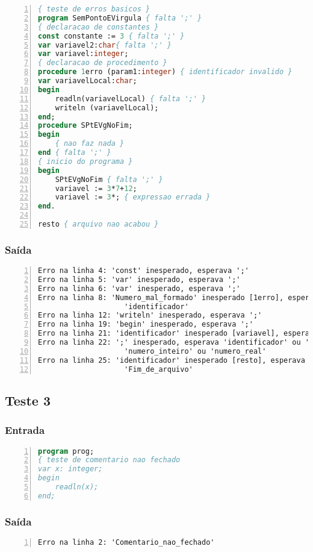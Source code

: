 \documentclass {article}
\begin{document}
	\begin{lstlisting}[language=Pascal,numbers=left,frame=top,frame=bottom]
{ teste de erros basicos }
program SemPontoEVirgula { falta ';' }
{ declaracao de constantes }
const constante := 3 { falta ';' }
var variavel2:char{ falta ';' }
var variavel:integer;
{ declaracao de procedimento }
procedure 1erro (param1:integer) { identificador invalido }
var variavelLocal:char;
begin
	readln(variavelLocal) { falta ';' }
	writeln (variavelLocal);
end;
procedure SPtEVgNoFim;
begin
	{ nao faz nada }
end { falta ';' }
{ inicio do programa }
begin
	SPtEVgNoFim { falta ';' }
	variavel := 3*7+12;
	variavel := 3*; { expressao errada }
end.

resto { arquivo nao acabou }
	\end{lstlisting}

	\subsubsection*{Saída}

	\begin{lstlisting}[numbers=left,frame=top,frame=bottom]
Erro na linha 4: 'const' inesperado, esperava ';'
Erro na linha 5: 'var' inesperado, esperava ';'
Erro na linha 6: 'var' inesperado, esperava ';'
Erro na linha 8: 'Numero_mal_formado' inesperado [1erro], esperava 
					'identificador'
Erro na linha 12: 'writeln' inesperado, esperava ';'
Erro na linha 19: 'begin' inesperado, esperava ';'
Erro na linha 21: 'identificador' inesperado [variavel], esperava ';'
Erro na linha 22: ';' inesperado, esperava 'identificador' ou '(' ou 
					'numero_inteiro' ou 'numero_real'
Erro na linha 25: 'identificador' inesperado [resto], esperava 
					'Fim_de_arquivo'
	\end{lstlisting}

	\subsection{Teste 3}

	\subsubsection*{Entrada}

	\begin{lstlisting}[language=Pascal,frame=top,frame=bottom,numbers=left]
program prog;
{ teste de comentario nao fechado
var x: integer;
begin
	readln(x);
end;
	\end{lstlisting}

	\subsubsection*{Saída}

	\begin{lstlisting}[frame=top,frame=bottom,numbers=left]
Erro na linha 2: 'Comentario_nao_fechado'
	\end{lstlisting}
	
\end{document}

